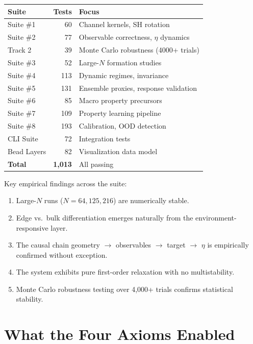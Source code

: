\documentclass[11pt]{article}
\begin{document}
\begin{center}
\begin{tabular}{lrl}
\toprule
Suite & Tests & Focus \\
\midrule
Suite \#1  & 60  & Channel kernels, SH rotation \\
Suite \#2  & 77  & Observable correctness, $\eta$ dynamics \\
Track 2    & 39  & Monte Carlo robustness (4000+ trials) \\
Suite \#3  & 52  & Large-$N$ formation studies \\
Suite \#4  & 113 & Dynamic regimes, invariance \\
Suite \#5  & 131 & Ensemble proxies, response validation \\
Suite \#6  & 85  & Macro property precursors \\
Suite \#7  & 109 & Property learning pipeline \\
Suite \#8  & 193 & Calibration, OOD detection \\
CLI Suite  & 72  & Integration tests \\
Bead Layers & 82 & Visualization data model \\
\midrule
\textbf{Total} & \textbf{1,013} & All passing \\
\bottomrule
\end{tabular}
\end{center}

Key empirical findings across the suite:
\begin{enumerate}
\item Large-$N$ runs ($N = 64, 125, 216$) are numerically stable.
\item Edge vs.\ bulk differentiation emerges naturally from the
      environment-responsive layer.
\item The causal chain geometry $\to$ observables $\to$ target $\to$
      $\eta$ is empirically confirmed without exception.
\item The system exhibits pure first-order relaxation with no
      multistability.
\item Monte Carlo robustness testing over 4,000+ trials confirms
      statistical stability.
\end{enumerate}

\section{What the Four Axioms Enabled}
\end{document}
